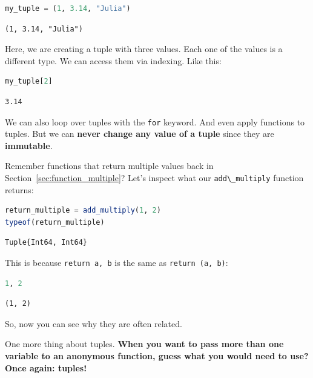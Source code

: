\documentclass[
  notoc %
]{tufte-book}
\newcommand{\passthrough}[1]{#1}
\begin{document}
\begin{lstlisting}[language=Julia]
my_tuple = (1, 3.14, "Julia")
\end{lstlisting}

\begin{lstlisting}[language=Output]
(1, 3.14, "Julia")
\end{lstlisting}

Here, we are creating a tuple with three values. Each one of the values
is a different type. We can access them via indexing. Like this:

\begin{lstlisting}[language=Julia]
my_tuple[2]
\end{lstlisting}

\begin{lstlisting}[language=Output]
3.14
\end{lstlisting}

We can also loop over tuples with the \passthrough{\lstinline!for!}
keyword. And even apply functions to tuples. But we can \textbf{never
change any value of a tuple} since they are \textbf{immutable}.

Remember functions that return multiple values back in
Section~\ref{sec:function_multiple}? Let's inspect what our
\passthrough{\lstinline!add\_multiply!} function returns:

\begin{lstlisting}[language=Julia]
return_multiple = add_multiply(1, 2)
typeof(return_multiple)
\end{lstlisting}

\begin{lstlisting}[language=Output]
Tuple{Int64, Int64}
\end{lstlisting}

This is because \passthrough{\lstinline!return a, b!} is the same as
\passthrough{\lstinline!return (a, b)!}:

\begin{lstlisting}[language=Julia]
1, 2
\end{lstlisting}

\begin{lstlisting}[language=Output]
(1, 2)
\end{lstlisting}

So, now you can see why they are often related.

One more thing about tuples. \textbf{When you want to pass more than one
variable to an anonymous function, guess what you would need to use?
Once again: tuples!}
\end{document}
